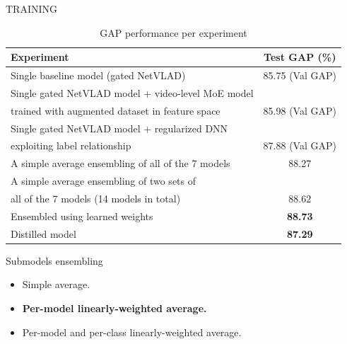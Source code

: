 \documentclass[final]{beamer}
\newlength{\colwidth}
\begin{document}
\begin{frame}[t]
\begin{columns}[t]
\begin{column}{\colwidth}
\begin{block}{TRAINING}
	\begin{table}[h!]
  \begin{center}
    \begin{tabular}{l|c} %
    \toprule
            \textbf{Experiment} & \textbf{Test GAP (\%)} \\
   	\midrule
            Single baseline model (gated NetVLAD) & 85.75 (Val GAP) \\
      \hline
            Single gated NetVLAD model + video-level MoE model\\
            trained with augmented dataset in feature space & 85.98 (Val GAP) \\
      \hline
            Single gated NetVLAD model + regularized DNN\\
            exploiting label relationship & 87.88 (Val GAP) \\
      \hline
      A simple average ensembling of all of the 7 models & 88.27 \\
      \hline
      A simple average ensembling of two sets of\\ all of the 7 models (14 models in total) & 88.62  \\
      \hline
            Ensembled using learned weights &  \textbf{88.73} \\
      \hline
            Distilled model & \textbf{87.29} \\
      \bottomrule
    \end{tabular}
    \caption{GAP performance per experiment}
    \label{tab:gap}
  \end{center}
\end{table}
  \end{block}
  
  	\begin{alertblock}{Submodels ensembling}
    \begin{itemize}
    	\item Simple average.
        \item \textbf{Per-model linearly-weighted average.}
		\item Per-model and per-class linearly-weighted average.
    \end{itemize}
    

\end{alertblock}
\end{column}
\end{columns}
\end{frame}
\end{document}
